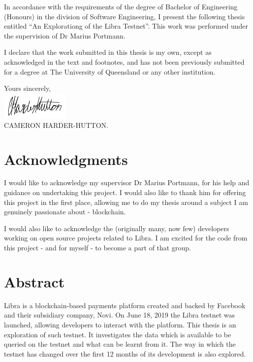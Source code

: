 \documentclass[12pt,openany,a4paper]{book}
\begin{document}
In accordance with the requirements of the degree of Bachelor of
Engineering (Honours) in the division of 
Software Engineering, I present the
following thesis entitled ``An Explorationg of the Libra Testnet''.
This work was performed under the supervision of
Dr Marius Portmann.

I declare that the work submitted in this thesis is my own, except as
acknowledged in the text and footnotes, and has not been previously
submitted for a degree at The University of Queensland or any other
institution.

\begin{flushright}
	Yours sincerely,\\
	\medskip
    \includegraphics[width=0.25\textwidth]{imgs/signature.png} \\
	\medskip
	CAMERON HARDER-HUTTON.
\end{flushright}

\cleardoublepage

\chapter{Acknowledgments}

I would like to acknowledge my supervisor Dr Marius Portmann, for his help 
and guidance on undertaking this project. I would also like to thank him for 
offering this project in the first place, allowing me to do my thesis around a subject 
I am genuinely passionate about - blockchain. 

I would also like to acknowledge the (originally many, now few) developers working
on open source projects related to Libra. I am excited for the code from this 
project - and for myself - to become a part of that group.

\cleardoublepage

\chapter{Abstract}

Libra is a blockchain-based payments platform created and backed by Facebook
and their subsidiary company, Novi. On 
June 18, 2019 the Libra testnet was launched, allowing developers to interact with
the platform. This thesis is an exploration of such testnet. It investigates the data
which is available to be queried on the testnet and what can be learnt from it.
The way in which the testnet has changed over the first 12 months of its development is 
also explored.
\end{document}
